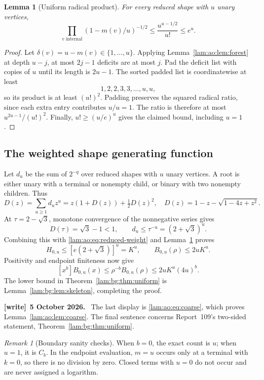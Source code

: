 \documentclass[11pt,a4paper]{article}
\numberwithin{equation}{section}
\newtheorem{lemma}[theorem]{Lemma}
\theoremstyle{remark}
\newtheorem{remark}[theorem]{Remark}
\newenvironment{writenote}[1][]{\par\smallskip\begingroup\small
 \noindent\textbf{[write]}\if\relax\detokenize{#1}\relax\else~\textbf{#1.}\fi\ }%
 {\par\endgroup\smallskip}
\begin{document}
\begin{lemma}[Uniform radical product]\label{lam:ao:lem:product}
For every reduced shape with $u$ unary vertices,
\begin{equation}\label{lam:ao:eq:product}
 \prod_{v\text{ internal}}(1-m(v)/u)^{-1/2}
       \le\frac{u^{u-1/2}}{u!}\le e^u.
\end{equation}
\end{lemma}
\begin{proof}
Let $\delta(v)=u-m(v)\in\{1,\ldots,u\}$. Applying Lemma~\ref{lam:ao:lem:forest} at depth $u-j$, at most $2j-1$ deficits are at most $j$. Pad the deficit list with copies of $u$ until its length is $2u-1$. The sorted padded list is coordinatewise at least
\[
 1,2,2,3,3,\ldots,u,u,
\]
so its product is at least $(u!)^2$. Padding preserves the squared radical ratio, since each extra entry contributes $u/u=1$. The ratio is therefore at most $u^{2u-1}/(u!)^2$. Finally, $u!\ge(u/e)^u$ gives the claimed bound, including $u=1$.
\end{proof}

\subsection{The weighted shape generating function}
Let $d_u$ be the sum of $2^{-q}$ over reduced shapes with $u$ unary vertices. A root is either unary with a terminal or nonempty child, or binary with two nonempty children. Thus
\begin{equation}\label{lam:ao:eq:shape-gf}
 D(z)=\sum_{u\ge1}d_uz^u=z(1+D(z))+\tfrac12D(z)^2,
 \quad D(z)=1-z-\sqrt{1-4z+z^2}.
\end{equation}
At $\tau=2-\sqrt3$, monotone convergence of the nonnegative series gives
\[
 D(\tau)=\sqrt3-1<1,\qquad d_u\le\tau^{-u}=(2+\sqrt3)^u.
\]
Combining this with \eqref{lam:ao:eq:reduced-weight} and Lemma~\ref{lam:ao:lem:product} proves
\[
 H_{0,u}\le[e(2+\sqrt3)]^u=K^u,
 \qquad B_{0,u}(\rho)\le2uK^u.
\]
Positivity and endpoint finiteness now give
\[
 [x^b]B_{0,u}(x)\le\rho^{-b}B_{0,u}(\rho)\le2uK^u(4u)^b.
\]
The lower bound in Theorem~\ref{lam:bg:thm:uniform} is Lemma~\ref{lam:bg:lem:skeleton}, completing the proof.
\begin{writenote}[5 October 2026]
The last display is \eqref{lam:ao:eq:coarse}, which proves Lemma~\ref{lam:ao:lem:coarse}. The final sentence concerns Report~109's two-sided statement, Theorem~\ref{lam:bg:thm:uniform}.
\end{writenote}

\begin{remark}[Boundary sanity checks]
When $b=0$, the exact count is $u$; when $u=1$, it is $C_b$. In the endpoint evaluation, $m=u$ occurs only at a terminal with $k=0$, so there is no division by zero. Closed terms with $u=0$ do not occur and are never assigned a logarithm.
\end{remark}
\end{document}
